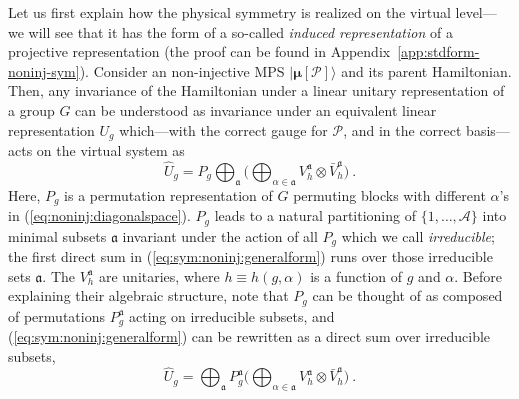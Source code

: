 \documentclass[twocolumn,superscriptaddress,prb,linenumbers]{revtex4-1}
\newcommand{\MPS}[1]{| {\bm\mu}[#1]\rangle}
\newcommand{\mc}[1]{\mathcal{#1}}
\begin{document}
Let us first explain how the physical symmetry is realized on the
virtual level---we will see that it has the form of a so-called
\emph{induced representation} of a projective representation (the proof
can be found in Appendix~\ref{app:stdform-noninj-sym}).
Consider an non-injective MPS $\MPS{\mc P}$ and its parent Hamiltonian.
Then, any invariance of the Hamiltonian under a linear unitary
representation of a group $G$ can be understood as invariance under an
equivalent linear representation $U_g$ which---with the correct gauge for
$\mc P$, and in the correct basis---acts on the virtual system as
\begin{equation}
    \label{eq:sym:noninj:generalform}
    \hat U_g =
    P_g
    \bigoplus_{\mathfrak a}
    \Big(\bigoplus_{\alpha\in \mathfrak a}
    V_h^{\mathfrak a}\otimes \bar V_h^{\mathfrak a}\Big)\ .
\end{equation}
Here, $P_g$ is a permutation representation of $G$ permuting blocks with
different $\alpha$'s in (\ref{eq:noninj:diagonalspace}). $P_g$ leads to a
natural partitioning of $\{1,\dots,\mc A\}$ into minimal subsets
$\mathfrak a$ invariant under the action of all $P_g$ which we call
\emph{irreducible}; the first direct sum in
(\ref{eq:sym:noninj:generalform}) runs over those irreducible sets
$\mathfrak a$.  The $V_h^{\mathfrak a}$ are unitaries, where $h\equiv
    h(g,\alpha)$ is a function of $g$ and $\alpha$. Before explaining their
algebraic structure, note that $P_g$ can be thought of as
composed of permutations $P_g^{\mathfrak a}$ acting on irreducible
subsets, and (\ref{eq:sym:noninj:generalform}) can be rewritten as a
direct sum over irreducible subsets,
\begin{equation}
    \label{eq:noninj:sym-irrep-blocks}
    \hat U_g=\bigoplus_{\mathfrak a}
    P_g^{\mathfrak a}
    \Big(\bigoplus_{\alpha\in \mathfrak a}
    V_h^{\mathfrak a}\otimes \bar V_h^{\mathfrak a}\Big)\ .
\end{equation}
\end{document}
